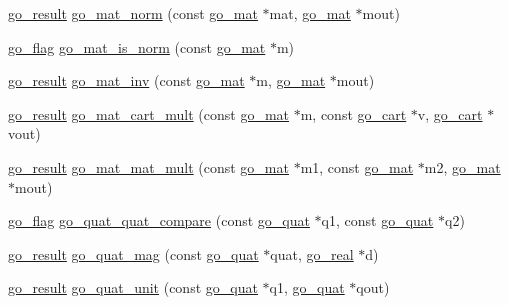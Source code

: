 \begin{DoxyCompactItemize}
\item 
\hyperlink{gotypes_8h_a55d48b38cd959f63c7e8db8337a9792a}{go\-\_\-result} \hyperlink{namespacegomotion_afb64295d1befa9e078204687259d3b6f}{go\-\_\-mat\-\_\-norm} (const \hyperlink{structgomotion_1_1go__mat}{go\-\_\-mat} $\ast$mat, \hyperlink{structgomotion_1_1go__mat}{go\-\_\-mat} $\ast$mout)
\item 
\hyperlink{gotypes_8h_ae890d9a0ddecc0d3073622cc4312092d}{go\-\_\-flag} \hyperlink{namespacegomotion_ad1aa76bab71411b00ce892a6ccd5c046}{go\-\_\-mat\-\_\-is\-\_\-norm} (const \hyperlink{structgomotion_1_1go__mat}{go\-\_\-mat} $\ast$m)
\item 
\hyperlink{gotypes_8h_a55d48b38cd959f63c7e8db8337a9792a}{go\-\_\-result} \hyperlink{namespacegomotion_a5a177297f36536f9e1f6c5dcd8564336}{go\-\_\-mat\-\_\-inv} (const \hyperlink{structgomotion_1_1go__mat}{go\-\_\-mat} $\ast$m, \hyperlink{structgomotion_1_1go__mat}{go\-\_\-mat} $\ast$mout)
\item 
\hyperlink{gotypes_8h_a55d48b38cd959f63c7e8db8337a9792a}{go\-\_\-result} \hyperlink{namespacegomotion_a7363f6dc600af28879b1ebaf69d20e5e}{go\-\_\-mat\-\_\-cart\-\_\-mult} (const \hyperlink{structgomotion_1_1go__mat}{go\-\_\-mat} $\ast$m, const \hyperlink{structgomotion_1_1go__cart}{go\-\_\-cart} $\ast$v, \hyperlink{structgomotion_1_1go__cart}{go\-\_\-cart} $\ast$vout)
\item 
\hyperlink{gotypes_8h_a55d48b38cd959f63c7e8db8337a9792a}{go\-\_\-result} \hyperlink{namespacegomotion_a8d1faf309408b9c06432ddfba0f5bf8f}{go\-\_\-mat\-\_\-mat\-\_\-mult} (const \hyperlink{structgomotion_1_1go__mat}{go\-\_\-mat} $\ast$m1, const \hyperlink{structgomotion_1_1go__mat}{go\-\_\-mat} $\ast$m2, \hyperlink{structgomotion_1_1go__mat}{go\-\_\-mat} $\ast$mout)
\item 
\hyperlink{gotypes_8h_ae890d9a0ddecc0d3073622cc4312092d}{go\-\_\-flag} \hyperlink{namespacegomotion_a5c86ff088b7e2a5281cb54d083bfada4}{go\-\_\-quat\-\_\-quat\-\_\-compare} (const \hyperlink{structgomotion_1_1go__quat}{go\-\_\-quat} $\ast$q1, const \hyperlink{structgomotion_1_1go__quat}{go\-\_\-quat} $\ast$q2)
\item 
\hyperlink{gotypes_8h_a55d48b38cd959f63c7e8db8337a9792a}{go\-\_\-result} \hyperlink{namespacegomotion_a16e13bdbbe8c3adb4a8c7f30e12a35fa}{go\-\_\-quat\-\_\-mag} (const \hyperlink{structgomotion_1_1go__quat}{go\-\_\-quat} $\ast$quat, \hyperlink{gotypes_8h_afd666a2393eebd71ee455846ac9def9b}{go\-\_\-real} $\ast$d)
\item 
\hyperlink{gotypes_8h_a55d48b38cd959f63c7e8db8337a9792a}{go\-\_\-result} \hyperlink{namespacegomotion_a61694fed512375ade28ae77c1ef36f6d}{go\-\_\-quat\-\_\-unit} (const \hyperlink{structgomotion_1_1go__quat}{go\-\_\-quat} $\ast$q1, \hyperlink{structgomotion_1_1go__quat}{go\-\_\-quat} $\ast$qout)

\end{DoxyCompactItemize}
